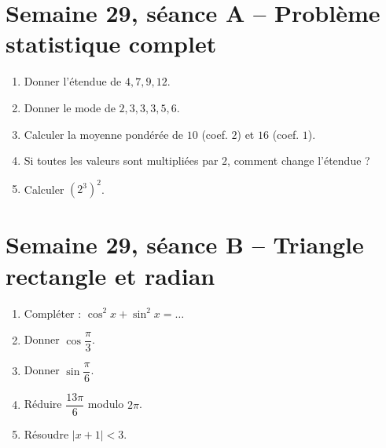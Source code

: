 \section{Semaine 29, séance A -- Problème statistique complet}
\begin{enumerate}
  \item Donner l'étendue de $4,7,9,12$.
  \item Donner le mode de $2,3,3,3,5,6$.
  \item Calculer la moyenne pondérée de $10$ (coef. $2$) et $16$ (coef. $1$).
  \item Si toutes les valeurs sont multipliées par $2$, comment change l'étendue ?
  \item Calculer $(2^3)^2$.
\end{enumerate}

\section{Semaine 29, séance B -- Triangle rectangle et radian}
\begin{enumerate}
  \item Compléter : $\cos^2x+\sin^2x=\ldots$
  \item Donner $\cos\dfrac{\pi}{3}$.
  \item Donner $\sin\dfrac{\pi}{6}$.
  \item Réduire $\dfrac{13\pi}{6}$ modulo $2\pi$.
  \item Résoudre $|x+1|<3$.
\end{enumerate}
\TeacherOnly{%
\begin{tcolorbox}[colback=VE!3,colframe=VE!35,boxrule=.4pt,arc=1mm]
\small\textit{Réponses.}\quad \textbf{1.} $1$. \quad \textbf{2.} $\dfrac12$. \quad \textbf{3.} $\dfrac12$. \quad \textbf{4.} $\dfrac{\pi}{6}$. \quad \textbf{5.} $x\in]-4;2[$.
\end{tcolorbox}}

